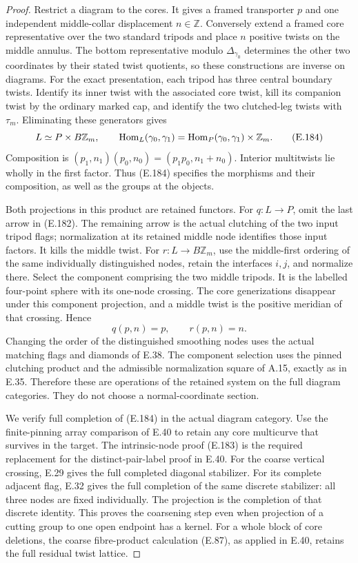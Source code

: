 \begin{proof}
Restrict a diagram to the cores.  It gives a framed transporter
$p$ and one independent middle-collar displacement $n\in\mathbb Z$.
Conversely extend a framed core representative over the two
standard tripods and place $n$ positive twists on the middle
annulus.  The bottom representative modulo $\Delta_{\gamma_0}$
determines the other two coordinates by their stated twist
quotients, so these constructions are inverse on diagrams.
For the exact presentation, each tripod has three central
boundary twists.  Identify its inner twist with the associated
core twist, kill its companion twist by the ordinary marked
cap, and identify the two clutched-leg twists with $\tau_m$.
Eliminating these generators gives
\[
 L\simeq P\times B\mathbb Z_m,\qquad
 \operatorname{Hom}_L(\gamma_0,\gamma_1)
       =\operatorname{Hom}_P(\gamma_0,\gamma_1)\times\mathbb Z_m.           \tag{E.184}
\]
Composition is $(p_1,n_1)(p_0,n_0)=(p_1p_0,n_1+n_0)$.
Interior multitwists lie wholly in the first factor.  Thus
(E.184) specifies the morphisms and their composition, as
well as the groups at the objects.

Both projections in this product are retained functors.
For $q:L\to P$, omit the last arrow in (E.182).  The remaining
arrow is the actual clutching of the two input tripod flags;
normalization at its retained middle node identifies those
input factors.  It kills the middle twist.  For
$r:L\to B\mathbb Z_m$, use the middle-first ordering of the
same individually distinguished nodes, retain the interfaces
$i,j$, and normalize there.  Select the component comprising
the two middle tripods.  It is the labelled four-point sphere
with its one-node crossing.  The core generizations disappear
under this component projection, and a middle twist is the
positive meridian of that crossing.  Hence
\[
              q(p,n)=p,\qquad r(p,n)=n.                     \tag{E.185}
\]
Changing the order of the distinguished smoothing nodes uses
the actual matching flags and diamonds of E.38.  The component
selection uses the pinned clutching product and the admissible
normalization square of A.15, exactly as in E.35.  Therefore
these are operations of the retained system on the full
diagram categories.  They do not choose a normal-coordinate
section.

We verify full completion of (E.184) in the actual diagram
category.  Use the finite-pinning array comparison of E.40
to retain any core multicurve that survives in the target.
The intrinsic-node proof (E.183) is the required replacement
for the distinct-pair-label proof in E.40.  For the coarse
vertical crossing, E.29 gives the full completed diagonal
stabilizer.  For its complete adjacent flag, E.32 gives the
full completion of the same discrete stabilizer: all three
nodes are fixed individually.  The projection is the
completion of that discrete identity.  This proves the
coarsening step even when projection of a cutting group to
one open endpoint has a kernel.  For a whole block of core
deletions, the coarse fibre-product calculation (E.87), as
applied in E.40, retains the full residual twist lattice.


\end{proof}
